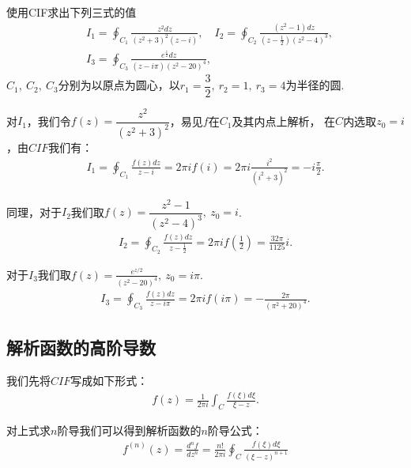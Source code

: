         \begin{example}
            使用CIF求出下列三式的值
            \begin{align*}
                &I_1 = \oint_{C_1}\frac{z^2dz}{(z^2+3)^2(z-i)},
                \quad I_2=\oint_{C_2}\frac{(z^2-1)dz}{(z-\frac{1}{2})(z^2-4)^3},\\
                &I_3=\oint_{C_3}\frac{e^{\frac{z}{2}}dz}{(z-i\pi)(z^2-20)^4},
            \end{align*}
            $C_1,\ C_2,\ C_3$分别为以原点为圆心，以$r_1=\dfrac{3}{2},\ r_2=1,\ r_3=4$为半径的圆.
        \end{example}
        \begin{solution}
            对$I_1$，我们令$f(z) = \dfrac{z^2}{(z^2+3)^2}$，易见$f$在$C_1$及其内点上解析，
            在$C$内选取$z_0 = i$，由$CIF$我们有：
            \begin{align*}
                I_1=\oint_{C_1}\frac{f(z)dz}{z-i}=2\pi i f(i)=2\pi i\frac{i^2}{(i^2+3)^2}=-i\frac{\pi}{2}.
            \end{align*}

            同理，对于$I_2$我们取$f(z) = \dfrac{z^2 - 1}{(z^2 - 4)^3},\ z_0 = i$.
            \begin{align*}
                I_2 = \oint_{C_2}\frac{f(z)dz}{z - \frac{1}{2}} = 2\pi i f(\frac{1}{2}) = \frac{32\pi}{1125}i.
            \end{align*}

            对于$I_3$我们取$f(z) = \frac{e^{z/2}}{(z^2 - 20)^4},\ z_0 = i\pi$.
            \begin{align*}
                I_3 = \oint_{C_3}\frac{f(z)dz}{z-i\pi}=2\pi i f(i\pi) = -\frac{2\pi}{(\pi^2+20)^4}.
            \end{align*}
        \end{solution}

    \subsection{解析函数的高阶导数}
        我们先将$CIF$写成如下形式：
        \begin{align*}
            f(z) = \frac{1}{2\pi i}\int_C \frac{f(\xi)d\xi}{\xi - z}.
        \end{align*}

        \begin{theorem}[解析函数的高阶导数]\label{thm:analytic_function_derivative}
            对上式求$n$阶导我们可以得到解析函数的$n$阶导公式：
            \begin{align*}
                f^{(n)}(z) = \frac{d^n f}{dz^n} = \frac{n!}{2\pi i}\oint_C \frac{f(\xi)d\xi}{(\xi - z)^{n + 1}}
            \end{align*}
        \end{theorem}

